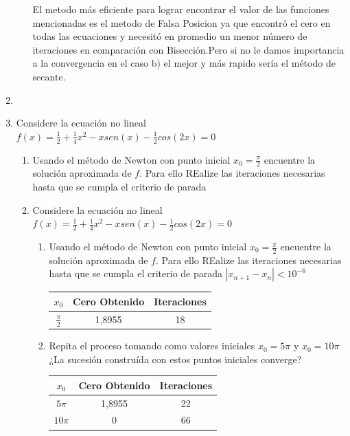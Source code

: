 \documentclass{udparticle}
\begin{document}
\begin{enumerate}
\begin{enumerate}
El metodo más eficiente para lograr encontrar el valor de las funciones mencionadas es el metodo de Falsa Posicion ya que encontró el cero en todas las ecuaciones y necesitó en promedio un menor número de iteraciones en comparación con Bisección.Pero si no le damos importancia a la convergencia en el caso b) el mejor y más rapido sería el método de secante.

\end{enumerate}
\newpage
\item %
\newpage
\item Considere la ecuación no lineal $f(x)= \frac{1}{2}+\frac{1}{4}x^2-xsen(x)-\frac{1}{2}cos(2x)=0$
	\begin{enumerate}
	\item  Usando el método de Newton con punto inicial $x_{0}=\frac{\pi}{2}$ encuentre la solución aproximada de $f$. Para ello REalize las iteraciones necesarias hasta que se cumpla el criterio de parada %

\item Considere la ecuación no lineal $f(x)= \frac{1}{2}+\frac{1}{4}x^2-xsen(x)-\frac{1}{2}cos(2x)=0$
	\begin{enumerate}
	\item  Usando el método de Newton con punto inicial $x_{0}=\frac{\pi}{2}$ encuentre la solución aproximada de $f$. Para ello REalize las iteraciones necesarias hasta que se cumpla el criterio de parada $|x_{n+1}-x_{n}| < 10^{-6} $

		\begin{table} [H]
			\centering
			\begin{tabular}{|c|c|c|}
				\hline
				$x_{0}$ & Cero Obtenido & Iteraciones\\
				\hline
				$\frac{\pi}{2} $ & 1,8955 & 18\\
				\hline 
			\end{tabular}
		\end{table}
	
	\item Repita el proceso tomando como valores iniciales $x_{0}=5\pi$ y $x_{0}=10\pi$ ¿La sucesión construída con estos puntos iniciales converge?
	 	\begin{table} [H]
			\centering
			\begin{tabular}{|c|c|c|}
				\hline
				$x_{0}$ & Cero Obtenido & Iteraciones\\
				\hline
				$5\pi$ & 1,8955 & 22 \\
				\hline 
				$10\pi$ & 0 & 66\\
				\hline
			\end{tabular}
		\end{table}
		

\end{enumerate}
\end{enumerate}
\end{enumerate}
\end{document}
